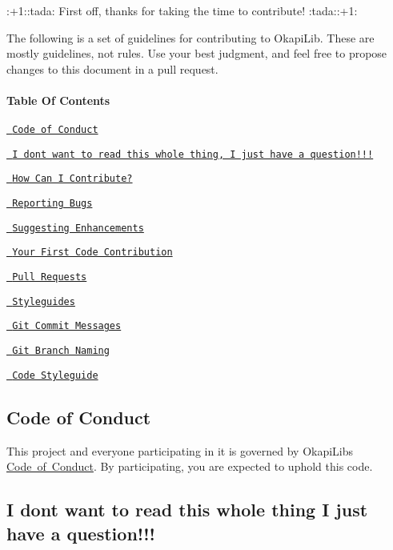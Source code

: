 \+:+1\+::tada\+: First off, thanks for taking the time to contribute! \+:tada\+:\+:+1\+:

The following is a set of guidelines for contributing to Okapi\+Lib. These are mostly guidelines, not rules. Use your best judgment, and feel free to propose changes to this document in a pull request.

\paragraph*{Table Of Contents}

\href{\#code-of-conduct}{\texttt{ Code of Conduct}}

\href{\#i-dont-want-to-read-this-whole-thing-i-just-have-a-question}{\texttt{ I don\textquotesingle{}t want to read this whole thing, I just have a question!!!}}

\href{\#how-can-i-contribute}{\texttt{ How Can I Contribute?}}
\begin{DoxyItemize}
\item \href{\#reporting-bugs}{\texttt{ Reporting Bugs}}
\item \href{\#suggesting-enhancements}{\texttt{ Suggesting Enhancements}}
\item \href{\#your-first-code-contribution}{\texttt{ Your First Code Contribution}}
\item \href{\#pull-requests}{\texttt{ Pull Requests}}
\end{DoxyItemize}

\href{\#styleguides}{\texttt{ Styleguides}}
\begin{DoxyItemize}
\item \href{\#git-commit-messages}{\texttt{ Git Commit Messages}}
\item \href{\#git-branch-naming}{\texttt{ Git Branch Naming}}
\item \href{\#code-styleguide}{\texttt{ Code Styleguide}}
\end{DoxyItemize}

\subsection*{Code of Conduct}

This project and everyone participating in it is governed by Okapi\+Lib\textquotesingle{}s \mbox{\hyperlink{md_code-of-conduct}{Code of Conduct}}. By participating, you are expected to uphold this code.

\subsection*{I don\textquotesingle{}t want to read this whole thing I just have a question!!!}

